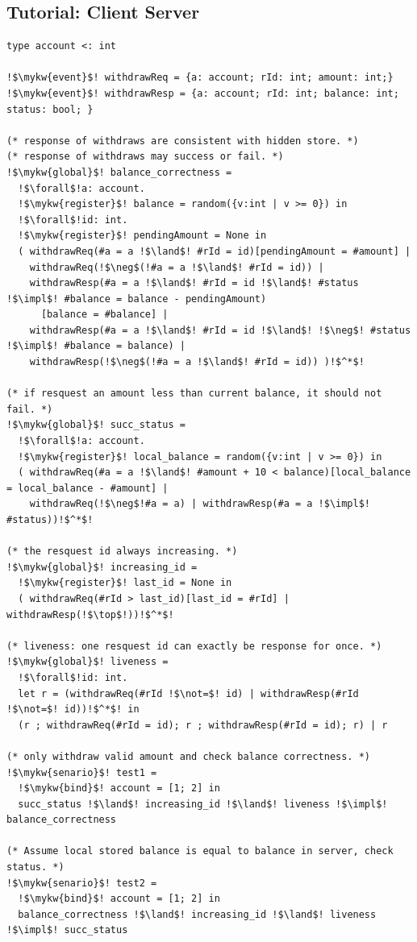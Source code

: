 \subsection{Tutorial: Client Server}

\begin{verbatim}
type account <: int

!$\mykw{event}$! withdrawReq = {a: account; rId: int; amount: int;}
!$\mykw{event}$! withdrawResp = {a: account; rId: int; balance: int; status: bool; }

(* response of withdraws are consistent with hidden store. *)
(* response of withdraws may success or fail. *)
!$\mykw{global}$! balance_correctness =
  !$\forall$!a: account. 
  !$\mykw{register}$! balance = random({v:int | v >= 0}) in
  !$\forall$!id: int. 
  !$\mykw{register}$! pendingAmount = None in
  ( withdrawReq(#a = a !$\land$! #rId = id)[pendingAmount = #amount] |
    withdrawReq(!$\neg$(!#a = a !$\land$! #rId = id)) |
    withdrawResp(#a = a !$\land$! #rId = id !$\land$! #status !$\impl$! #balance = balance - pendingAmount)
      [balance = #balance] |
    withdrawResp(#a = a !$\land$! #rId = id !$\land$! !$\neg$! #status !$\impl$! #balance = balance) |
    withdrawResp(!$\neg$(!#a = a !$\land$! #rId = id)) )!$^*$!

(* if resquest an amount less than current balance, it should not fail. *)
!$\mykw{global}$! succ_status =
  !$\forall$!a: account. 
  !$\mykw{register}$! local_balance = random({v:int | v >= 0}) in
  ( withdrawReq(#a = a !$\land$! #amount + 10 < balance)[local_balance = local_balance - #amount] |
    withdrawReq(!$\neg$!#a = a) | withdrawResp(#a = a !$\impl$! #status))!$^*$!

(* the resquest id always increasing. *)
!$\mykw{global}$! increasing_id =
  !$\mykw{register}$! last_id = None in
  ( withdrawReq(#rId > last_id)[last_id = #rId] | withdrawResp(!$\top$!))!$^*$!

(* liveness: one resquest id can exactly be response for once. *)
!$\mykw{global}$! liveness =
  !$\forall$!id: int.
  let r = (withdrawReq(#rId !$\not=$! id) | withdrawResp(#rId !$\not=$! id))!$^*$! in
  (r ; withdrawReq(#rId = id); r ; withdrawResp(#rId = id); r) | r

(* only withdraw valid amount and check balance correctness. *)
!$\mykw{senario}$! test1 =
  !$\mykw{bind}$! account = [1; 2] in
  succ_status !$\land$! increasing_id !$\land$! liveness !$\impl$! balance_correctness

(* Assume local stored balance is equal to balance in server, check status. *)
!$\mykw{senario}$! test2 =
  !$\mykw{bind}$! account = [1; 2] in
  balance_correctness !$\land$! increasing_id !$\land$! liveness !$\impl$! succ_status
\end{verbatim}